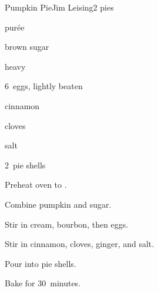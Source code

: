 \begin{recipe}{Pumpkin Pie}{Jim Leising}{2 pies}

\begin{ingredients}
\item \C{1\threequarter}  pur\'ee
\item {} brown sugar
\item \C{1\half} heavy 
\item \C{\half} 
\item 6~eggs, lightly beaten
\item {} cinnamon
\item \tp{\half} cloves
\item \tp{1\half} 
\item \tp{\quarter} salt
\item 2~pie shells
\end{ingredients}

\begin{directions}
\item Preheat oven to .
\item Combine pumpkin and sugar.
\item Stir in cream, bourbon, then eggs.
\item Stir in cinnamon, cloves, ginger, and salt.
\item Pour into pie shells.
\item Bake for 30~minutes.
\end{directions}

\end{recipe}
